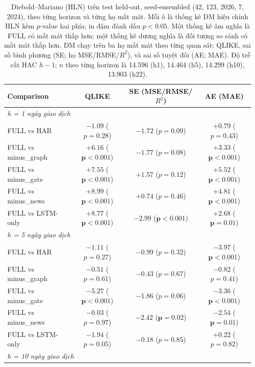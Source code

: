\documentclass[runningheads]{llncs}
\begin{document}
\begin{table}[t]
\caption{Diebold--Mariano (HLN) trên test held-out, seed-ensembled (42, 123, 2026, 7, 2024), theo từng
horizon và từng họ mất mát. Mỗi ô là thống kê DM hiệu chỉnh HLN kèm $p$-value hai phía; in đậm đánh dấu
$p<0.05$. Một thống kê âm nghĩa là FULL có mất mát thấp hơn; một thống kê dương nghĩa là đối tượng so
sánh có mất mát thấp hơn. DM chạy trên ba họ mất mát theo từng quan sát: QLIKE, sai số bình phương (SE;
họ MSE/RMSE/$R^2$), và sai số tuyệt đối (AE; MAE). Độ trễ cắt HAC $h{-}1$; $n$ theo từng horizon là 14.596
(h1), 14.464 (h5), 14.299 (h10), 13.903 (h22).}
\label{tab:dm}
\centering
\begin{tabular}{lccc}
\toprule
Comparison & QLIKE & SE (MSE/RMSE/$R^2$) & AE (MAE) \\
\midrule
\multicolumn{4}{l}{\textit{h = 1 ngày giao dịch}}\\
FULL vs HAR         & $-1.09$ ($p = 0.28$) & $-1.72$ ($p = 0.09$) & $+0.79$ ($p = 0.43$) \\
FULL vs minus\_graph & $\mathbf{+6.16}$ ($\mathbf{p<0.001}$) & $-1.77$ ($p = 0.08$) & $\mathbf{+3.33}$ ($\mathbf{p<0.001}$) \\
FULL vs minus\_gate  & $\mathbf{+7.55}$ ($\mathbf{p<0.001}$) & $+1.57$ ($p = 0.12$) & $\mathbf{+5.52}$ ($\mathbf{p<0.001}$) \\
FULL vs minus\_news  & $\mathbf{+8.99}$ ($\mathbf{p<0.001}$) & $+0.74$ ($p = 0.46$) & $\mathbf{+4.81}$ ($\mathbf{p<0.001}$) \\
FULL vs LSTM-only   & $\mathbf{+8.77}$ ($\mathbf{p<0.001}$) & $\mathbf{-2.99}$ ($\mathbf{p<0.001}$) & $\mathbf{+2.68}$ ($\mathbf{p = 0.01}$) \\
\midrule
\multicolumn{4}{l}{\textit{h = 5 ngày giao dịch}}\\
FULL vs HAR         & $-1.11$ ($p = 0.27$) & $-0.99$ ($p = 0.32$) & $\mathbf{-3.97}$ ($\mathbf{p<0.001}$) \\
FULL vs minus\_graph & $-0.51$ ($p = 0.61$) & $-0.43$ ($p = 0.67$) & $-0.82$ ($p = 0.41$) \\
FULL vs minus\_gate  & $\mathbf{-5.27}$ ($\mathbf{p<0.001}$) & $-1.86$ ($p = 0.06$) & $\mathbf{-3.36}$ ($\mathbf{p<0.001}$) \\
FULL vs minus\_news  & $-0.03$ ($p = 0.97$) & $\mathbf{-2.42}$ ($\mathbf{p = 0.02}$) & $\mathbf{-2.54}$ ($\mathbf{p = 0.01}$) \\
FULL vs LSTM-only   & $-1.94$ ($p = 0.05$) & $-0.18$ ($p = 0.85$) & $+0.22$ ($p = 0.82$) \\
\midrule
\multicolumn{4}{l}{\textit{h = 10 ngày giao dịch}}\\

\end{tabular}
\end{table}
\end{document}
